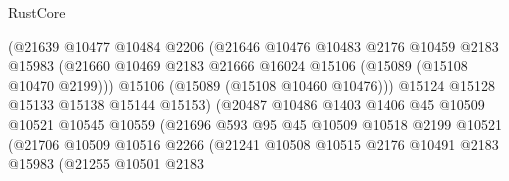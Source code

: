 \begin{lexlean}{RustCore}
\begin{coremodule}
                                  (@21639
                                    @10477
                                    @10484
                                    @2206
                                    (@21646
                                      @10476
                                      @10483
                                      @2176
                                      @10459
                                      @2183
                                      @15983
                                      (@21660
                                        @10469
                                        @2183
                                        @21666
                                        @16024
                                        @15106
                                        (@15089 (@15108 @10470 @2199)))
                                      @15106
                                      (@15089 (@15108 @10460 @10476)))
                                    @15124
                                    @15128
                                    @15133
                                    @15138
                                    @15144
                                    @15153)
                                  (@20487
                                    @10486
                                    @1403
                                    @1406
                                    @45
                                    @10509
                                    @10521
                                    @10545
                                    @10559
                                    (@21696
                                      @593
                                      @95
                                      @45
                                      @10509
                                      @10518
                                      @2199
                                      @10521
                                      (@21706
                                        @10509
                                        @10516
                                        @2266
                                        (@21241
                                          @10508
                                          @10515
                                          @2176
                                          @10491
                                          @2183
                                          @15983
                                          (@21255
                                            @10501
                                            @2183

\end{coremodule}
\end{lexlean}
